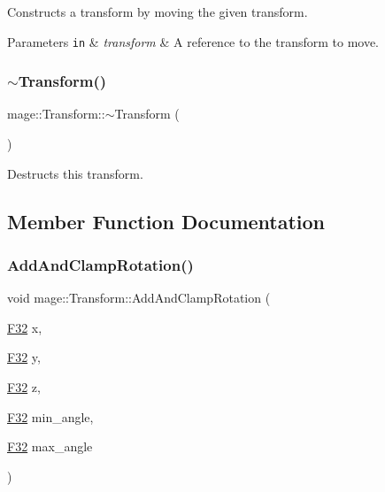 Constructs a transform by moving the given transform.


\begin{DoxyParams}[1]{Parameters}
\mbox{\tt in}  & {\em transform} & A reference to the transform to move. \\
\hline
\end{DoxyParams}
\hypertarget{classmage_1_1_transform_a2da8c6542920e0748a504c32c54073f6}{}\label{classmage_1_1_transform_a2da8c6542920e0748a504c32c54073f6} 
\subsubsection{\texorpdfstring{$\sim$\+Transform()}{~Transform()}}
{\footnotesize\ttfamily mage\+::\+Transform\+::$\sim$\+Transform (\begin{DoxyParamCaption}{ }\end{DoxyParamCaption})\hspace{0.3cm}{\ttfamily [default]}}

Destructs this transform. 

\subsection{Member Function Documentation}
\hypertarget{classmage_1_1_transform_a7d71b079115dcfae2747191f786713e1}{}\label{classmage_1_1_transform_a7d71b079115dcfae2747191f786713e1} 
\subsubsection{\texorpdfstring{Add\+And\+Clamp\+Rotation()}{AddAndClampRotation()}\hspace{0.1cm}{\footnotesize\ttfamily [1/3]}}
{\footnotesize\ttfamily void mage\+::\+Transform\+::\+Add\+And\+Clamp\+Rotation (\begin{DoxyParamCaption}\item[{\hyperlink{namespacemage_aa97e833b45f06d60a0a9c4fc22ae02c0}{F32}}]{x,  }\item[{\hyperlink{namespacemage_aa97e833b45f06d60a0a9c4fc22ae02c0}{F32}}]{y,  }\item[{\hyperlink{namespacemage_aa97e833b45f06d60a0a9c4fc22ae02c0}{F32}}]{z,  }\item[{\hyperlink{namespacemage_aa97e833b45f06d60a0a9c4fc22ae02c0}{F32}}]{min\+\_\+angle,  }\item[{\hyperlink{namespacemage_aa97e833b45f06d60a0a9c4fc22ae02c0}{F32}}]{max\+\_\+angle }\end{DoxyParamCaption})\hspace{0.3cm}{\ttfamily [noexcept]}}

